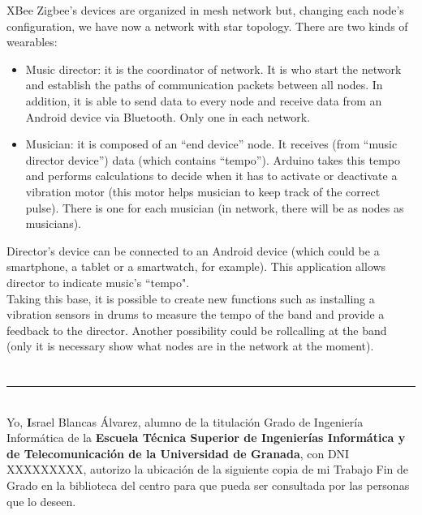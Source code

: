 XBee Zigbee’s devices are organized in mesh network but, changing each node’s configuration, we have now a network with
star topology. There are two kinds of wearables:
  \begin{itemize}
  \item Music director: it is the coordinator of network. It is who start the network and establish the paths of communication packets between all nodes. In addition, it is able to send data to every node and receive data from an Android device via Bluetooth. Only one in each network.
  \item Musician: it is composed of an “end device” node. It receives (from “music director device”) data (which contains “tempo”). Arduino takes this tempo and performs calculations to decide when it has to activate or deactivate a vibration motor (this motor helps musician to keep track of the correct pulse). There is one for each musician (in network, there will be as nodes as musicians).
  \end{itemize}


Director’s device can be connected to an Android device (which could be a smartphone, a tablet or a smartwatch, for example).
This application allows director to indicate music’s
``tempo".\\

Taking this base, it is possible to create new functions such as installing a vibration sensors in drums to measure the
tempo of the band and provide a feedback to the director. Another possibility could be rollcalling at the band (only it
is necessary show what nodes are in the network at the moment).\\


\chapter*{}
\thispagestyle{empty}

\noindent\rule[-1ex]{\textwidth}{2pt}\\[4.5ex]

Yo, \textbf Israel Blancas Álvarez, alumno de la titulación Grado de Ingeniería Informática de la \textbf{Escuela Técnica Superior
de Ingenierías Informática y de Telecomunicación de la Universidad de Granada}, con DNI XXXXXXXXX, autorizo la
ubicación de la siguiente copia de mi Trabajo Fin de Grado en la biblioteca del centro para que pueda ser
consultada por las personas que lo deseen.

\vspace{6cm}

